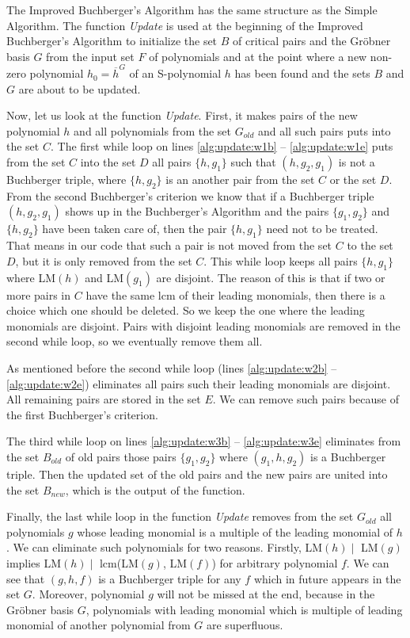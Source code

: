 The Improved Buchberger's Algorithm has the same structure as the Simple Algorithm. The function \textit{Update} is used at the beginning of the Improved Buchberger's Algorithm to initialize the set $B$ of critical pairs and the Gr\"obner basis $G$ from the input set $F$ of polynomials and at the point where a new non-zero polynomial $h_0 = \overline{h}^G$ of an S-polynomial $h$ has been found and the sets $B$ and $G$ are about to be updated.



Now, let us look at the function \textit{Update}. First, it makes pairs of the new polynomial $h$ and all polynomials from the set $G_{old}$ and all such pairs puts into the set $C$. The first while loop on lines \ref{alg:update:w1b} -- \ref{alg:update:w1e} puts from the set $C$ into the set $D$ all pairs $\{h, g_1\}$ such that $(h, g_2, g_1)$ is not a Buchberger triple, where $\{h, g_2\}$ is an another pair from the set $C$ or the set $D$. From the second Buchberger's criterion we know that if a Buchberger triple $(h, g_2, g_1)$ shows up in the Buchberger's Algorithm and the pairs $\{g_1, g_2\}$ and $\{h, g_2\}$ have been taken care of, then the pair $\{h, g_1\}$ need not to be treated. That means in our code that such a pair is not moved from the set $C$ to the set $D$, but it is only removed from the set $C$. This while loop keeps all pairs $\{h, g_1\}$ where LM$(h)$ and LM$(g_1)$ are disjoint. The reason of this is that if two or more pairs in $C$ have the same lcm of their leading monomials, then there is a choice which one should be deleted. So we keep the one where the leading monomials are disjoint. Pairs with disjoint leading monomials are removed in the second while loop, so we eventually remove them all.

As mentioned before the second while loop (lines \ref{alg:update:w2b} -- \ref{alg:update:w2e}) eliminates all pairs such their leading monomials are disjoint. All remaining pairs are stored in the set $E$. We can remove such pairs because of the first Buchberger's criterion.

The third while loop on lines \ref{alg:update:w3b} -- \ref{alg:update:w3e} eliminates from the set $B_{old}$ of old pairs those pairs $\{g_1, g_2\}$ where $(g_1, h, g_2)$ is a Buchberger triple. Then the updated set of the old pairs and the new pairs are united into the set $B_{new}$, which is the output of the function.

Finally, the last while loop in the function \textit{Update} removes from the set $G_{old}$ all polynomials $g$ whose leading monomial is a multiple of the leading monomial of $h$. We can eliminate such polynomials for two reasons. Firstly, LM$(h) \mid$ LM$(g)$ implies LM$(h) \mid$ lcm(LM$(g)$, LM$(f)$) for arbitrary polynomial $f$. We can see that $(g, h, f)$ is a Buchberger triple for any $f$ which in future appears in the set $G$. Moreover, polynomial $g$ will not be missed at the end, because in the Gr\"obner basis $G$, polynomials with leading monomial which is multiple of leading monomial of another polynomial from $G$ are superfluous.

